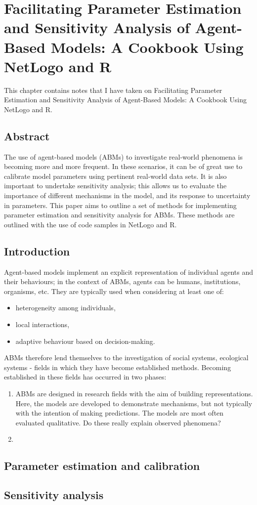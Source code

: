 \chapter{Facilitating Parameter Estimation and Sensitivity Analysis of Agent-Based Models: A Cookbook Using NetLogo and R}
\label{ch:thiele_kurther_grimm}

This chapter contains notes that I have taken on Facilitating Parameter Estimation and Sensitivity Analysis of Agent-Based Models: A Cookbook Using NetLogo and R\citep{thiele_facilitating_2014}.

\section*{Abstract}
\label{thiele:absract}

The use of agent-based models (ABMs) to investigate real-world phenomena is becoming more and more frequent.
In these scenarios, it can be of great use to calibrate model parameters using pertinent real-world data sets.
It is also important to undertake sensitivity analysis; this allows us to evaluate the importance of different mechanisms in the model, and its response to uncertainty in parameters.
This paper aims to outline a set of methods for implementing parameter estimation and sensitivity analysis for ABMs.
These methods are outlined with the use of code samples in NetLogo and R.

\section{Introduction}
\label{thiele:introduction}

Agent-based models implement an explicit representation of individual agents and their behaviours; in the context of ABMs, agents can be humans, institutions, organisms, etc.
They are typically used when considering at least one of:
\begin{itemize}
    \item heterogeneity among individuals,
    \item local interactions,
    \item adaptive behaviour based on decision-making.
\end{itemize}
ABMs therefore lend themselves to the investigation of social systems, ecological systems - fields in which they have become established methods.
Becoming established in these fields has occurred in two phases:
\begin{enumerate}
    \item ABMs are designed in research fields with the aim of building representations. 
    Here, the models are developed to demonstrate mechanisms, but not typically with the intention of making predictions.
    The models are most often evaluated qualitative.
    Do these really explain observed phenomena?
    \item 
\end{enumerate}

\section{Parameter estimation and calibration}
\label{thiele:parameter_estimation}

\section{Sensitivity analysis}
\label{thiele:sensitivity_analysis}

